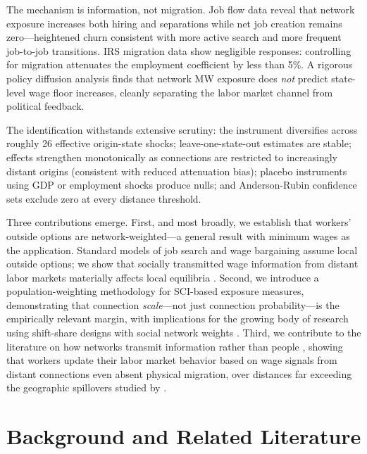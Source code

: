 \documentclass[12pt]{article}
\begin{document}
The mechanism is information, not migration. Job flow data reveal that network exposure increases both hiring and separations while net job creation remains zero---heightened churn consistent with more active search and more frequent job-to-job transitions. IRS migration data show negligible responses: controlling for migration attenuates the employment coefficient by less than 5\%. A rigorous policy diffusion analysis finds that network MW exposure does \textit{not} predict state-level wage floor increases, cleanly separating the labor market channel from political feedback.

The identification withstands extensive scrutiny: the instrument diversifies across roughly 26 effective origin-state shocks; leave-one-state-out estimates are stable; effects strengthen monotonically as connections are restricted to increasingly distant origins (consistent with reduced attenuation bias); placebo instruments using GDP or employment shocks produce nulls; and Anderson-Rubin confidence sets exclude zero at every distance threshold.

Three contributions emerge. First, and most broadly, we establish that workers' outside options are network-weighted---a general result with minimum wages as the application. Standard models of job search and wage bargaining assume local outside options; we show that socially transmitted wage information from distant labor markets materially affects local equilibria \citep{jager2024worker}. Second, we introduce a population-weighting methodology for SCI-based exposure measures, demonstrating that connection \textit{scale}---not just connection probability---is the empirically relevant margin, with implications for the growing body of research using shift-share designs with social network weights \citep{bailey2018social, bailey2018house, chetty2022social}. Third, we contribute to the literature on how networks transmit information rather than people \citep{kramarz2023, faberman2022}, showing that workers update their labor market behavior based on wage signals from distant connections even absent physical migration, over distances far exceeding the geographic spillovers studied by \citet{dube2014designing}.


\section{Background and Related Literature}
\label{sec:background}
\end{document}
